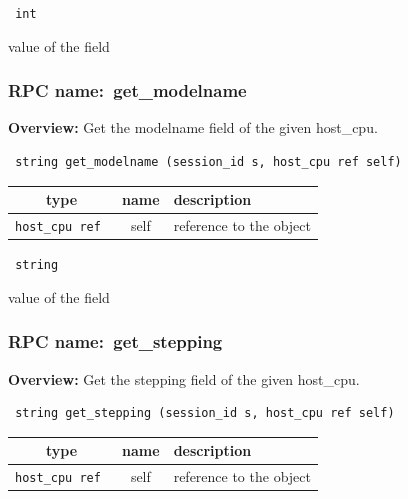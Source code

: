 \vspace{0.3cm}

{\tt 
int
}


value of the field
\vspace{0.3cm}
\vspace{0.3cm}
\vspace{0.3cm}
\subsubsection{RPC name:~get\_modelname}

{\bf Overview:} 
Get the modelname field of the given host\_cpu.

\begin{verbatim} string get_modelname (session_id s, host_cpu ref self)\end{verbatim}



 
\vspace{0.3cm}
\begin{tabular}{|c|c|p{7cm}|}
 \hline
{\bf type} & {\bf name} & {\bf description} \\ \hline
{\tt host\_cpu ref } & self & reference to the object \\ \hline 

\end{tabular}

\vspace{0.3cm}

{\tt 
string
}


value of the field
\vspace{0.3cm}
\vspace{0.3cm}
\vspace{0.3cm}
\subsubsection{RPC name:~get\_stepping}

{\bf Overview:} 
Get the stepping field of the given host\_cpu.

\begin{verbatim} string get_stepping (session_id s, host_cpu ref self)\end{verbatim}



 
\vspace{0.3cm}
\begin{tabular}{|c|c|p{7cm}|}
 \hline
{\bf type} & {\bf name} & {\bf description} \\ \hline
{\tt host\_cpu ref } & self & reference to the object \\ \hline 

\end{tabular}

